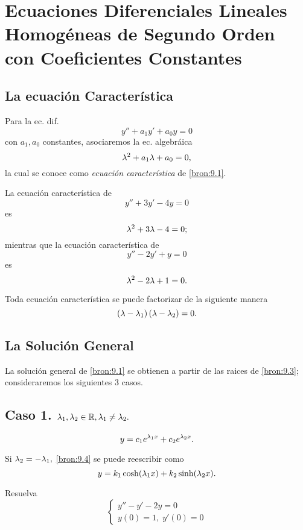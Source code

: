 \section{Ecuaciones Diferenciales Lineales Homog\'eneas de Segundo Orden con Coeficientes Constantes}

\subsection{La ecuaci\'on Caracter\'istica}


Para la ec. dif.
\[
	\label{bron:9.1}
	y''+a_{1}y'+a_{0}y=0
\]
con $a_{1},a_{0}$ constantes, asociaremos la ec. algebráica
\[
	\label{bron:9.2}
	\lambda^{2}+a_{1}\lambda+a_{0}=0,
\]
la cual se conoce como \emph{ecuaci\'on caracter\'istica} de \eqref{bron:9.1}.



\begin{problema}
	La ecuaci\'on caracter\'istica de $$y''+3y'-4y=0$$ es  $$\lambda^{2}+3\lambda-4=0;$$  mientras que la ecuaci\'on caracter\'istica de $$y''-2y'+y=0$$ es  $$\lambda^{2}-2\lambda+1=0.$$
\end{problema}




Toda ecuaci\'on caracter\'istica se puede factorizar de la siguiente manera
\[
	\label{bron:9.3}
	\left( \lambda- \lambda_{1} \right)\left( \lambda-\lambda_{2} \right)=0.
\]



\subsection{La Soluci\'on General}


La soluci\'on general de \eqref{bron:9.1} se obtienen a partir de las raices de \eqref{bron:9.3}; consideraremos los siguientes 3 casos.




\subsection{Caso 1. $\lambda_{1}, \lambda_{2}\in \mathbb{R}, \lambda_{1}\neq \lambda_{2}.$ }

\[
	\label{bron:9.4}
	y=c_{1}e^{\lambda_{1}x}+c_{2}e^{\lambda_{2}x}.
\]

Si $\lambda_{2}=-\lambda_{1},$ \eqref{bron:9.4} se puede reescribir como
$$
y=k_{1}\cosh(\lambda_{1}x)+k_{2}\sinh(\lambda_{2}x).
$$




\begin{problema}
	\label{bron:exmp:9.1}
	Resuelva
	$$\begin{cases}
		y''-y'-2y=0\\
		y(0)=1, \; y'(0)=0
	\end{cases}
	$$
\end{problema}






